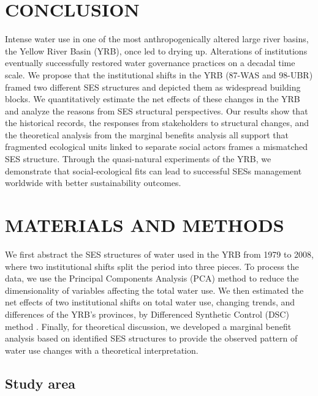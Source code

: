 \documentclass[default, sn-standardnature]{sn-jnl} %
\providecommand{\DIFaddbegin}{} %
\providecommand{\DIFaddend}{} %
\newcommand{\DIFaddincludegraphics}[2][]{{\color{blue}\fbox{\DIFOincludegraphics[#1]{#2}}}} %
\DeclareRobustCommand{\DIFaddbegin}{\DIFOaddbegin \let\includegraphics\DIFaddincludegraphics} %
\DeclareRobustCommand{\DIFaddend}{\DIFOaddend \let\includegraphics\DIFOincludegraphics} %
\begin{document}
\section{CONCLUSION}\label{sec:conclusion}

Intense water use in one of the most anthropogenically altered large river basins, the Yellow River Basin (YRB), once led to drying up.
Alterations of institutions eventually successfully restored water governance practices on a decadal time scale.
We propose that the institutional shifts in the YRB (87-WAS and 98-UBR) framed two different SES structures and depicted them as widespread building blocks.
We quantitatively estimate the net effects of these changes in the YRB and analyze the reasons from SES structural perspectives.
Our results show that the historical records, the responses from stakeholders to structural changes, and the theoretical analysis from the marginal benefits analysis all support that fragmented ecological units linked to separate social actors frames a mismatched SES structure.
Through the quasi-natural experiments of the YRB, we demonstrate that social-ecological fits can lead to successful SESs management worldwide with better sustainability outcomes.


\section{MATERIALS AND METHODS}\label{sec:methods}

We first abstract the SES structures of water used in the YRB from 1979 to 2008, where two institutional shifts split the period into three pieces.
To process the data, we use the Principal Components Analysis (PCA) method to reduce the dimensionality of variables affecting the total water use.
We then estimated the net effects of two institutional shifts on total water use, changing trends, and differences of the YRB's provinces, by Differenced Synthetic Control (DSC) method \cite{arkhangelsky2021}.
Finally, for theoretical discussion, we developed a marginal benefit analysis based on identified SES structures to provide the observed pattern of water use changes with a theoretical interpretation.

\DIFaddbegin \subsection{Study area}\label{sec:yrb}
\DIFaddend
\end{document}
